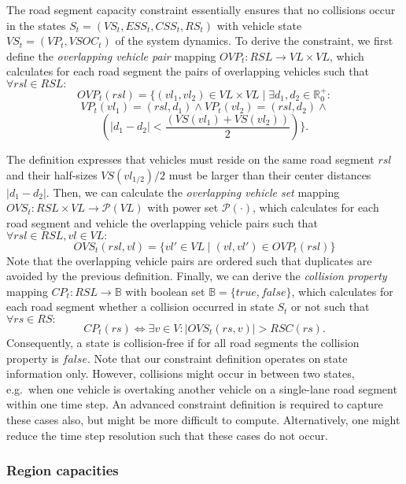 The road segment capacity constraint essentially ensures that no collisions occur in the states $S_t = (VS_t, ESS_t, CSS_t, RS_t)$ with vehicle state $VS_t = (VP_t, VSOC_t)$ of the system dynamics. To derive the constraint, we first define the \textit{overlapping vehicle pair} mapping $OVP_t : RSL \rightarrow VL \times VL$, which calculates for each road segment the pairs of overlapping vehicles such that $\forall rsl \in RSL:$
\[
	OVP_t(rsl) = \{(vl_1, vl_2) \in VL \times VL \mid \exists d_1, d_2 \in \mathbb{R}_0^+:
\]
\[
	VP_t(vl_1) = (rsl, d_1) \wedge VP_t(vl_2) = (rsl, d_2) \wedge
\]
\[
(|d_1 - d_2| < \frac{(VS(vl_1)+VS(vl_2))}{2} ) \} \textrm{.}	
\]


The definition expresses that vehicles must reside on the same road segment $rsl$ and their half-sizes $VS(vl_{1/2}) / 2$ must be larger than their center distances $|d_1 - d_2|$. Then, we can calculate the \textit{overlapping vehicle set} mapping $OVS_t : RSL \times VL \rightarrow \mathcal{P}(VL)$ with power set $\mathcal{P}(\cdot)$, which calculates for each road segment and vehicle the overlapping vehicle pairs such that $\forall rsl \in RSL, vl \in VL:$
\[
	OVS_t(rsl,vl) = \{vl' \in VL \mid (vl, vl') \in OVP_t(rsl)\}
\]
Note that the overlapping vehicle pairs are ordered such that duplicates are avoided by the previous definition. Finally, we can derive the \textit{collision property} mapping $CP_t : RSL \rightarrow \mathbb{B}$ with boolean set $\mathbb{B} = \{true, false\}$, which calculates for each road segment whether a collision occurred in state $S_t$ or not such that $\forall rs \in RS:$
\[
	CP_t(rs) \Leftrightarrow \exists v \in V : |OVS_t(rs, v)| > RSC(rs) \textrm{.}
\]
Consequently, a state is collision-free if for all road segments the collision property is $false$. Note that our constraint definition operates on state information only. However, collisions might occur in between two states, e.g.\ when one vehicle is overtaking another vehicle on a single-lane road segment within one time step. An advanced constraint definition is required to capture these cases also, but might be more difficult to compute. Alternatively, one might reduce the time step resolution such that these cases do not occur.

\subsubsection{Region capacities}
\label{capacities}

